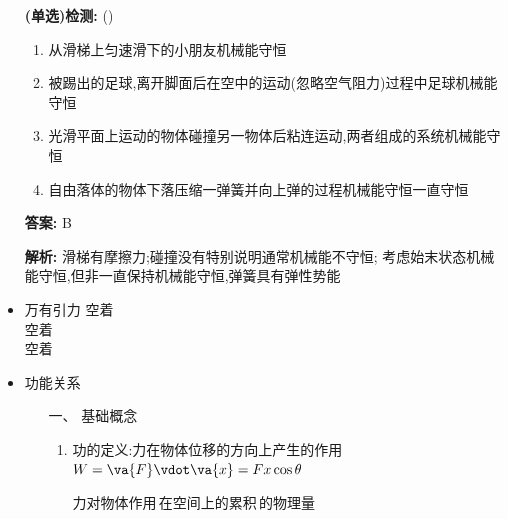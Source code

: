 \documentclass{article}
\begin{document}
\begin{itemize}
          \vspace{1em}

    \item[] \textbf{(单选)检测:} (\qquad)

        \begin{enumerate}[label=\Alph*.]
            \item 从滑梯上匀速滑下的小朋友机械能守恒
            \item 被踢出的足球,离开脚面后在空中的运动(忽略空气阻力)过程中足球机械能守恒
            \item 光滑平面上运动的物体碰撞另一物体后粘连运动,两者组成的系统机械能守恒
            \item 自由落体的物体下落压缩一弹簧并向上弹的过程机械能守恒一直守恒
        \end{enumerate}

        \textbf{答案:} B

        \textbf{解析:} 滑梯有摩擦力;碰撞没有特别说明通常机械能不守恒;
        考虑始末状态机械能守恒,但非一直保持机械能守恒,弹簧具有弹性势能

        \hspace{2em}

    \item 万有引力
          空着    \\
          空着    \\
          空着    \\

          \hspace{2em}

    \item 功能关系
          \begin{enumerate}
              \item[一、] 基础概念
                  \begin{enumerate}
                      \item 功的定义:力在物体位移的方向上产生的作用$ W = \va{F} \vdot \va{x} = Fx\cos{\theta}$

                            \vspace{-1em}

                            \hspace{-1em}\begin{adjustbox}{minipage=0.37\linewidth, bgcolor=gray!20, padding=1em}
                                \small %
                                力对物体作用\,在空间上的累积\,的物理量
                            \end{adjustbox}


\end{enumerate}
\end{enumerate}
\end{itemize}
\end{document}
